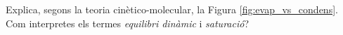 \begin{exr}
Explica, segons la teoria cinètico-molecular, la Figura \ref{fig:evap_vs_condens}. Com interpretes els termes \emph{equilibri dinàmic} i \emph{saturació}?
\end{exr}